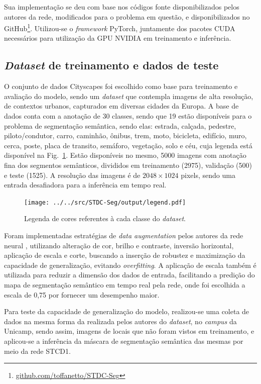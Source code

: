 \documentclass[conference]{IEEEtran}
\begin{document}
Sua implementação se deu com base nos códigos fonte disponibilizados pelos autores da rede, modificados para o problema em questão, e disponibilizados no GitHub\footnote{\href{https://github.com/toffanetto/STDC-Seg}{github.com/toffanetto/STDC-Seg}}. Utilizou-se o \textit{framework} PyTorch, juntamente dos pacotes CUDA necessários para utilização da GPU NVIDIA em treinamento e inferência.


\subsection{\textit{Dataset} de treinamento e dados de teste}

O conjunto de dados Cityscapes \cite{cordts2016CityscapesDatasetSemantic} foi escolhido como base para treinamento e avaliação do modelo, sendo um \textit{dataset} que contempla imagens de alta resolução, de contextos urbanos, capturados em diversas cidades da Europa. A base de dados conta com a anotação de 30 classes, sendo que 19 estão disponíveis para o problema de segmentação semântica, sendo elas: estrada, calçada, pedestre, piloto/condutor, carro, caminhão, ônibus, trem, moto, bicicleta, edifício, muro, cerca, poste, placa de transito, semáforo, vegetação, solo e céu, cuja legenda está disponível na Fig.~\ref{fig:legend}. Estão disponíveis no mesmo, 5000 imagens com anotação fina dos segmentos semânticos, divididos em treinamento (2975), validação (500) e teste (1525). A resolução das imagens é de $2048 \times 1024$ pixels, sendo uma entrada desafiadora para a inferência em tempo real.

\begin{figure}[h!]
	\centering
	\texttt{[image: ../../src/STDC-Seg/output/legend.pdf]}
	\caption{Legenda de cores referentes à cada classe do \textit{dataset}.}
	\label{fig:legend}
\end{figure}

Foram implementadas estratégias de \textit{data augmentation} pelos autores da rede neural \cite{fan2021RethinkingBiSeNetRealtime}, utilizando alteração de cor, brilho e contraste, inversão horizontal, aplicação de escala e corte, buscando a inserção de robustez e maximização da capacidade de generalização, evitando \textit{overfitting}. A aplicação de escala também é utilizada para reduzir a dimensão dos dados de entrada, facilitando a predição do mapa de segmentação semântico em tempo real pela rede, onde foi escolhida a escala de 0,75 por fornecer um desempenho maior.

Para teste da capacidade de generalização do modelo, realizou-se uma coleta de dados na mesma forma da realizada pelos autores do \textit{dataset}, no \textit{campus} da Unicamp, sendo assim, imagens de locais que não foram vistos em treinamento, e aplicou-se a inferência da máscara de segmentação semântica das mesmas por meio da rede STCD1.
\end{document}
